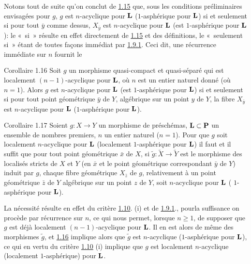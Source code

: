 \documentclass[10pt]{../fichiers-configuration-latex/smfart}
\begin{document}
Notons tout de suite qu'on conclut de \hyperref[XV.thm1.15]{1.15} que, sous les conditions
préliminaires envisagées pour $g$, $g$ est $n$-acyclique pour
$\mathbf{L}$ (\resp $1$-asphérique pour $\mathbf{L}$) si et seulement
si pour tout $\bar{y}$ comme dessus, $X_{\bar{y}}$ est $n$-acyclique
pour $\mathbf{L}$ (\resp est $1$-asphérique pour $\mathbf{L}$): le « si »  résulte en effet directement de \hyperref[XV.thm1.15]{1.15} et des définitions, le
« seulement si »  étant de toutes façons immédiat par
\hyperref[XV.cor1.9.1]{1.9.1}. Ceci dit, une récurrence immédiate sur $n$ fournit le

\begin{enonce*}{Corollaire 1.16}
Soit $g$ un morphisme quasi-compact et quasi-séparé qui est
localement $(n-1)$-acyclique pour $\mathbf{L}$, où $n$ est un entier
naturel donné (\resp où $n=1$). Alors $g$ est $n$-acyclique pour
$\mathbf{L}$ (\resp est $1$-asphérique pour $\mathbf{L}$) si et
seulement si pour tout point géométrique $\bar{y}$ de $Y$, algébrique
sur un point $y$ de $Y$, la fibre $X_{\bar{y}}$ est $n$-acyclique pour
$\mathbf{L}$ (\resp $1$-asphérique pour $\mathbf{L}$).
\end{enonce*}

\begin{enonce*}{Corollaire 1.17}
Soient $g:X\rightarrow Y$ un morphisme de préschémas,
$\mathbf{L}\subset \mathbf{P}$ un ensemble de nombres premiers, $n$ un
entier naturel (\resp $n=1$). Pour que $g$ soit localement
$n$-acyclique pour $\mathbf{L}$ (\resp localement $1$-asphérique pour
$\mathbf{L}$) il faut et il suffit que pour tout point géométrique
$\bar{x}$ de $X$, si $\widetilde{g}:\widetilde{X}\rightarrow
\widetilde{Y}$ est le morphisme des localisés stricts de $X$ et $Y$
(en $\bar{x}$ et le point géométrique correspondant $\bar{y}$ de $Y$)
induit par $g$, chaque fibre géométrique $X_{\bar{z}}$ de $g$,
relativement à un point géométrique $\bar{z}$ de $Y$ algébrique sur un
point $z$ de $Y$, soit $n$-acyclique pour $\mathbf{L}$ (\resp
$1$-asphérique pour $\mathbf{L}$).
\end{enonce*}

La nécessité résulte en effet du critère \hyperref[XV.prop1.10]{1.10}. 
(i) et de \hyperref[XV.cor1.9.1]{1.9.1}.,
pour\pageoriginale la suffisance on procède par récurrence sur $n$, ce
qui nous permet, lorsque $n\geq 1$, de supposer que $g$ est déjà
localement $(n-1)$-acyclique pour $\mathbf{L}$. Il en est alors de
même des morphismes $\widetilde{g}$, et \hyperref[XV.cor1.16]{1.16} implique alors que
$\widetilde{g}$ est $n$-acyclique (\resp $1$-asphérique pour
$\mathbf{L}$), ce qui en vertu du critère \hyperref[XV.prop1.10]{1.10} (i) implique que $g$
est localement $n$-acyclique (\resp localement $1$-asphérique) pour
$\mathbf{L}$.
\end{document}
